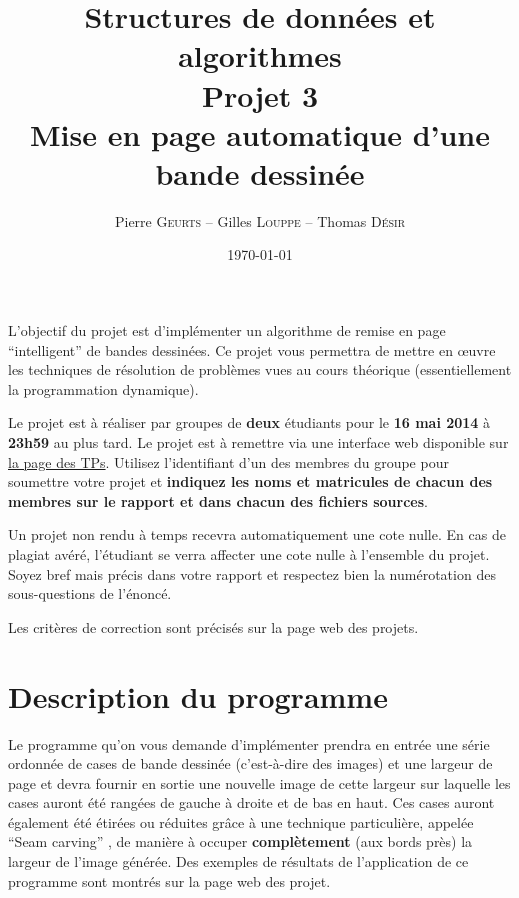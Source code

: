 \documentclass[a4paper,10pt]{article}
\title{
    \textbf{Structures de données et algorithmes}\\
    {Projet 3\\Mise en page automatique d'une bande dessinée}
}
\author{Pierre \textsc{Geurts} -- Gilles \textsc{Louppe} -- Thomas \textsc{Désir}}
\date{\today}
\begin{document}
\maketitle

L'objectif du projet est d'implémenter un algorithme de remise en page
``intelligent'' de bandes dessinées.  Ce projet vous permettra de
mettre en \oe uvre les techniques de résolution de problèmes vues au
cours théorique (essentiellement la programmation dynamique).

Le projet est à réaliser par groupes de {\bf deux} étudiants pour le
{\bf 16 mai 2014} à {\bf 23h59} au plus tard. Le projet est
à remettre via une interface web disponible sur
\href{http://www.montefiore.ulg.ac.be/~glouppe/2013-2014/students.info0902.php}{la
  page des TPs}. Utilisez l'identifiant d'un des membres du groupe
pour soumettre votre projet et \textbf{indiquez les noms et matricules
  de chacun des membres sur le rapport et dans chacun des fichiers
  sources}.

Un projet non rendu à temps recevra automatiquement une cote nulle. En
cas de plagiat avéré, l'étudiant se verra affecter une cote nulle à
l'ensemble du projet. Soyez bref mais précis dans votre rapport et
respectez bien la numérotation des sous-questions de l'énoncé.

Les critères de correction sont précisés sur la page web des projets.

\section{Description du programme}

Le programme qu'on vous demande d'implémenter prendra en entrée une
série ordonnée de cases de bande dessinée (c'est-à-dire des images) et
une largeur de page et devra fournir en sortie une nouvelle image de
cette largeur sur laquelle les cases auront été rangées de gauche à
droite et de bas en haut. Ces cases auront également été étirées ou
réduites grâce à une technique particulière, appelée ``Seam carving''
\cite{seamcarving}, de manière à occuper {\bf complètement} (aux bords
près) la largeur de l'image générée. Des exemples de résultats de
l'application de ce programme sont montrés sur la page web des projet.
\end{document}
